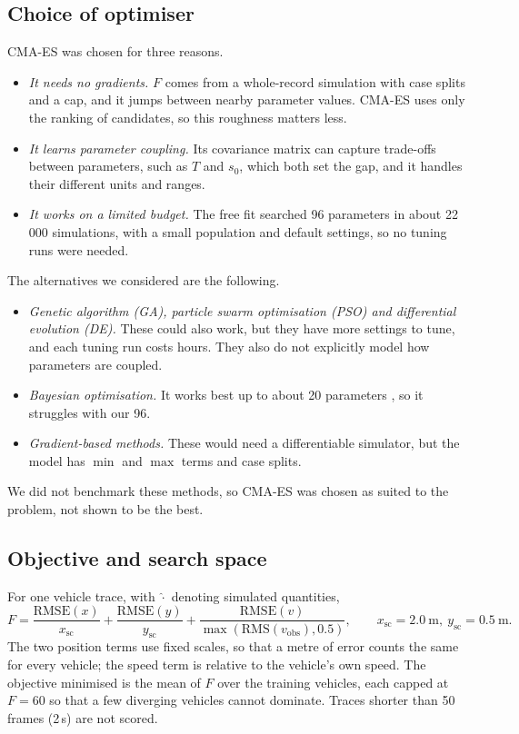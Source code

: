 \documentclass[11pt]{article}
\begin{document}
\subsection{Choice of optimiser}
CMA-ES was chosen for three reasons.
\begin{itemize}
\item \emph{It needs no gradients.} $F$ comes from a whole-record simulation with
case splits and a cap, and it jumps between nearby parameter values. CMA-ES uses
only the ranking of candidates, so this roughness matters less.
\item \emph{It learns parameter coupling.} Its covariance matrix can capture
trade-offs between parameters, such as $T$ and $s_0$, which both set the gap, and
it handles their different units and ranges.
\item \emph{It works on a limited budget.} The free fit searched 96 parameters in
about 22\,000 simulations, with a small population and default settings, so no
tuning runs were needed.
\end{itemize}
The alternatives we considered are the following.
\begin{itemize}
\item \emph{Genetic algorithm (GA), particle swarm optimisation (PSO) and
differential evolution (DE).} These could also work, but they have more settings
to tune, and each tuning run costs hours. They also do not explicitly model how
parameters are coupled.
\item \emph{Bayesian optimisation.} It works best up to about 20 parameters
\cite{bo}, so it struggles with our 96.
\item \emph{Gradient-based methods.} These would need a differentiable simulator,
but the model has $\min$ and $\max$ terms and case splits.
\end{itemize}
We did not benchmark these methods, so CMA-ES was chosen as suited to the
problem, not shown to be the best.

\subsection{Objective and search space}
For one vehicle trace, with $\hat\cdot$ denoting simulated quantities,
\begin{equation}
F=\frac{\mathrm{RMSE}(x)}{x_{\mathrm{sc}}}
+\frac{\mathrm{RMSE}(y)}{y_{\mathrm{sc}}}
+\frac{\mathrm{RMSE}(v)}{\max(\mathrm{RMS}(v_{\mathrm{obs}}),0.5)},
\qquad x_{\mathrm{sc}}=2.0\ \mathrm m,\ y_{\mathrm{sc}}=0.5\ \mathrm m.
\label{eq:F}
\end{equation}
The two position terms use fixed scales, so that a metre of error counts the
same for every vehicle; the speed term is relative to the vehicle's own speed.
The objective minimised is the mean of $F$ over the training vehicles, each
capped at $F=60$ so that a few diverging vehicles cannot dominate. Traces
shorter than 50 frames (2\,s) are not scored.
\end{document}
